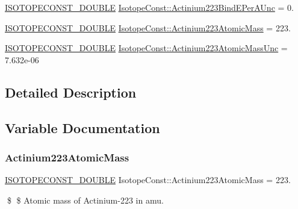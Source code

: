 \begin{DoxyCompactItemize}
\mbox{\hyperlink{group___isotope_const-_macros_ga8f45a7272ce02c0b4c65c44636ed719a}{I\+S\+O\+T\+O\+P\+E\+C\+O\+N\+S\+T\+\_\+\+D\+O\+U\+B\+LE}} \mbox{\hyperlink{group___isotope_const-_actinium-_ac223_gae9ffd86f5f950506de79a8c40794a5a3}{Isotope\+Const\+::\+Actinium223\+Bind\+E\+Per\+A\+Unc}} = 0.
\item 
\mbox{\hyperlink{group___isotope_const-_macros_ga8f45a7272ce02c0b4c65c44636ed719a}{I\+S\+O\+T\+O\+P\+E\+C\+O\+N\+S\+T\+\_\+\+D\+O\+U\+B\+LE}} \mbox{\hyperlink{group___isotope_const-_actinium-_ac223_gad5f929a86af544db87c89c7af15f2267}{Isotope\+Const\+::\+Actinium223\+Atomic\+Mass}} = 223.
\item 
\mbox{\hyperlink{group___isotope_const-_macros_ga8f45a7272ce02c0b4c65c44636ed719a}{I\+S\+O\+T\+O\+P\+E\+C\+O\+N\+S\+T\+\_\+\+D\+O\+U\+B\+LE}} \mbox{\hyperlink{group___isotope_const-_actinium-_ac223_ga5084fc38d351b162bdeaecbf8f856c13}{Isotope\+Const\+::\+Actinium223\+Atomic\+Mass\+Unc}} = 7.\+632e-\/06
\end{DoxyCompactItemize}


\subsection{Detailed Description}


\subsection{Variable Documentation}
\mbox{\label{group___isotope_const-_actinium-_ac223_gad5f929a86af544db87c89c7af15f2267}} 
\subsubsection{\texorpdfstring{Actinium223\+Atomic\+Mass}{Actinium223AtomicMass}}
{\footnotesize\ttfamily \mbox{\hyperlink{group___isotope_const-_macros_ga8f45a7272ce02c0b4c65c44636ed719a}{I\+S\+O\+T\+O\+P\+E\+C\+O\+N\+S\+T\+\_\+\+D\+O\+U\+B\+LE}} Isotope\+Const\+::\+Actinium223\+Atomic\+Mass = 223.}

\$ \$ Atomic mass of Actinium-\/223 in amu. \mbox{\label{group___isotope_const-_actinium-_ac223_ga5084fc38d351b162bdeaecbf8f856c13}} 
